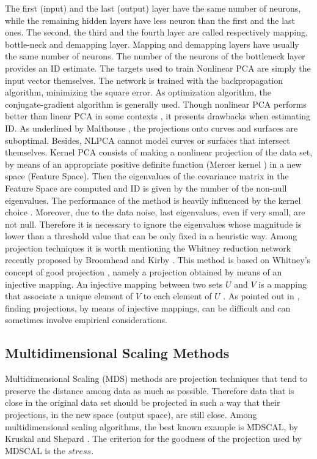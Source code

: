 \documentclass[journal]{IEEEtran}
\begin{document}
The first (input) and the last (output) layer have the same number of neurons, while the 
remaining hidden layers have less neuron than the first and the last ones. 
The second, the third and the fourth layer are called respectively mapping, bottle-neck and demapping layer. 
Mapping and demapping layers have usually the same number of neurons. The number of the neurons of the bottleneck layer 
provides an ID estimate. The targets used to train Nonlinear PCA are simply the input vector themselves. 
The network is trained with the backpropagation algorithm, minimizing the square error. As optimization algorithm, 
the conjugate-gradient algorithm \cite{Vetterling89} is generally used. 
Though nonlinear PCA performs better than linear PCA in some contexts \cite{Fotheringhame97}, it presents drawbacks when estimating ID. 
As underlined by Malthouse \cite{Malthouse98}, the projections onto curves and surfaces are suboptimal. 
Besides, NLPCA cannot model curves or surfaces that intersect themselves. Kernel PCA consists of making a nonlinear projection of the data set, 
by means of an appropriate positive definite function (Mercer kernel ) \cite{Ressel84} in a new space (Feature Space). 
Then the eigenvalues of the covariance matrix in the Feature Space are computed and ID is given by the number of the non-null eigenvalues. 
The performance of the method is heavily influenced by the kernel choice \cite{Camastra02}. 
Moreover, due to the data noise, last eigenvalues, even if very small, are not null. 
Therefore it is necessary to ignore the eigenvalues whose magnitude is lower than a threshold value that can be only fixed in a heuristic way.
Among projection techniques it is worth mentioning the Whitney reduction network recently proposed by Broomhead and Kirby \cite{Kirby01,Kirby2000}. 
This method is based on Whitney’s concept of good projection \cite{Whitney36}, namely a projection obtained by means of an injective mapping. 
An injective mapping between two sets \(U\) and \(V\) is a mapping that associate a unique element of \(V\) to each element of \(U\) . As
pointed out in \cite{Kirby01}, finding projections, by means of injective mappings, can be difficult and can sometimes involve empirical considerations.

\subsection{Multidimensional Scaling Methods}
Multidimensional Scaling (MDS) methods are projection techniques that tend to preserve the distance among data as much as possible. 
Therefore data that is close in the original data set should be projected in such a way that their projections, 
in the new space (output space), are still close. Among multidimensional scaling algorithms, 
the best known example is MDSCAL, by Kruskal \cite{Kruskal64} and Shepard \cite{Shepard62}. The criterion for the goodness of the projection used by MDSCAL is the \(stress\).
\end{document}
